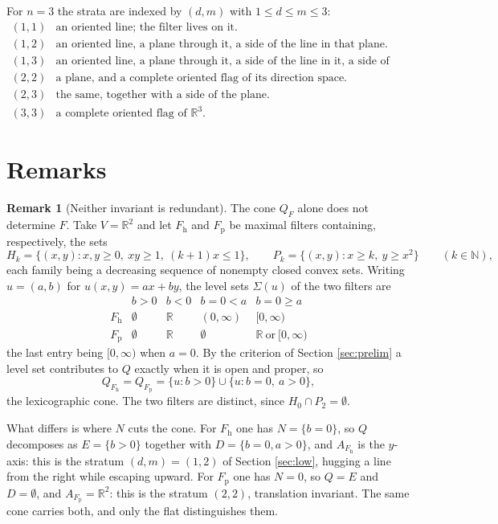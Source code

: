 \documentclass[11pt]{amsart}
\theoremstyle{plain}
\theoremstyle{definition}
\newtheorem{remark}[theorem]{Remark}
\newcommand{\RR}{\mathbb{R}}
\begin{document}
For $n=3$ the strata are indexed by $(d,m)$ with $1\le d\le m\le3$:
\[
\begin{array}{ll}
(1,1)&\text{an oriented line; the filter lives on it.}\\
(1,2)&\text{an oriented line, a plane through it, a side of the line in that plane.}\\
(1,3)&\text{an oriented line, a plane through it, a side of the line in it, a side of the plane.}\\
(2,2)&\text{a plane, and a complete oriented flag of its direction space.}\\
(2,3)&\text{the same, together with a side of the plane.}\\
(3,3)&\text{a complete oriented flag of }\RR^3 .
\end{array}
\]

\section{Remarks}\label{sec:remarks}

\begin{remark}[Neither invariant is redundant]\label{rem:independent}
The cone $Q_F$ alone does not determine $F$. Take $V=\RR^2$ and let $F_{\mathrm{h}}$ and $F_{\mathrm{p}}$ be maximal filters containing, respectively, the sets
\[
H_k=\{(x,y):x,y\ge0,\ xy\ge1,\ (k+1)x\le1\},\qquad
P_k=\{(x,y):x\ge k,\ y\ge x^2\}\qquad(k\in\mathbb{N}),
\]
each family being a decreasing sequence of nonempty closed convex sets. Writing $u=(a,b)$ for $u(x,y)=ax+by$, the level sets $\Sigma(u)$ of the two filters are
\[
\begin{array}{lcccc}
 & b>0 & b<0 & b=0<a & b=0\ge a\\
F_{\mathrm{h}} & \emptyset & \RR & (0,\infty) & [0,\infty)\\
F_{\mathrm{p}} & \emptyset & \RR & \emptyset & \RR\ \text{or}\ [0,\infty)
\end{array}
\]
the last entry being $[0,\infty)$ when $a=0$. By the criterion of Section \ref{sec:prelim} a level set contributes to $Q$ exactly when it is open and proper, so
\[
Q_{F_{\mathrm{h}}}=Q_{F_{\mathrm{p}}}=\{u:b>0\}\cup\{u:b=0,\ a>0\},
\]
the lexicographic cone. The two filters are distinct, since $H_0\cap P_2=\emptyset$.

What differs is where $N$ cuts the cone. For $F_{\mathrm{h}}$ one has $N=\{b=0\}$, so $Q$ decomposes as $E=\{b>0\}$ together with $D=\{b=0,a>0\}$, and $A_{F_{\mathrm{h}}}$ is the $y$-axis: this is the stratum $(d,m)=(1,2)$ of Section \ref{sec:low}, hugging a line from the right while escaping upward. For $F_{\mathrm{p}}$ one has $N=0$, so $Q=E$ and $D=\emptyset$, and $A_{F_{\mathrm{p}}}=\RR^2$: this is the stratum $(2,2)$, translation invariant. The same cone carries both, and only the flat distinguishes them.
\end{remark}
\end{document}

